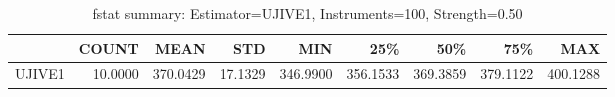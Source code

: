 \begin{table}[ht]
\centering
\caption{fstat summary: Estimator=UJIVE1, Instruments=100, Strength=0.50}
\begin{tabular}{lrrrrrrrr}
\toprule
 & COUNT & MEAN & STD & MIN & 25\% & 50\% & 75\% & MAX \\
\midrule
UJIVE1 & 10.0000 & 370.0429 & 17.1329 & 346.9900 & 356.1533 & 369.3859 & 379.1122 & 400.1288 \\
\bottomrule
\end{tabular}
\end{table}
